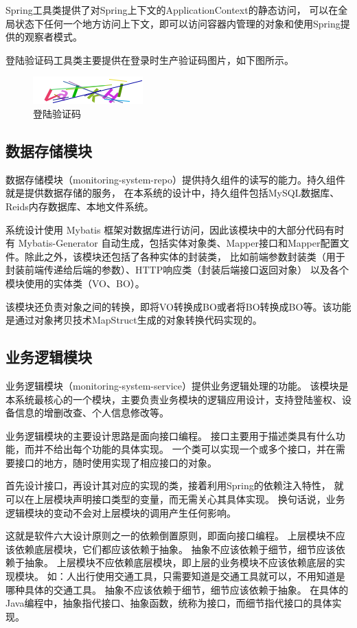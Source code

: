 Spring工具类提供了对Spring上下文的ApplicationContext的静态访问，
可以在全局状态下任何一个地方访问上下文，即可以访问容器内管理的对象和使用Spring提供的观察者模式。

登陆验证码工具类主要提供在登录时生产验证码图片，如下图所示。

\begin{figure}[ht]
    \centering
    \includegraphics[width=0.5\linewidth]{./Figure/IMG_code.png}
    \caption{登陆验证码}\label{Fig:code}
\end{figure}

\subsection{数据存储模块}
数据存储模块（monitoring-system-repo）提供持久组件的读写的能力。持久组件就是提供数据存储的服务，
在本系统的设计中，持久组件包括MySQL数据库、Reids内存数据库、本地文件系统。

系统设计使用 Mybatis 框架对数据库进行访问，因此该模块中的大部分代码有时有 Mybatis-Generator
自动生成，包括实体对象类、Mapper接口和Mapper配置文件。除此之外，该模块还包括了各种实体的封装类，
比如前端参数封装类（用于封装前端传递给后端的参数）、HTTP响应类（封装后端接口返回对象）
以及各个模块使用的实体类（VO、BO）。

该模块还负责对象之间的转换，即将VO转换成BO或者将BO转换成BO等。该功能是通过对象拷贝技术MapStruct生成的对象转换代码实现的。

\subsection{业务逻辑模块}
业务逻辑模块（monitoring-system-service）提供业务逻辑处理的功能。
该模块是本系统最核心的一个模块，主要负责业务模块的逻辑应用设计，支持登陆鉴权、设备信息的增删改查、个人信息修改等。

业务逻辑模块的主要设计思路是面向接口编程。
接口主要用于描述类具有什么功能，而并不给出每个功能的具体实现。
一个类可以实现一个或多个接口，并在需要接口的地方，随时使用实现了相应接口的对象。

首先设计接口，再设计其对应的实现的类，接着利用Spring的依赖注入特性，
就可以在上层模块声明接口类型的变量，而无需关心其具体实现。
换句话说，业务逻辑模块的变动不会对上层模块的调用产生任何影响。

这就是软件六大设计原则之一的依赖倒置原则，即面向接口编程。
上层模块不应该依赖底层模块，它们都应该依赖于抽象。
抽象不应该依赖于细节，细节应该依赖于抽象。
上层模块不应依赖底层模块，即上层的业务模块不应该依赖底层的实现模块。
如：人出行使用交通工具，只需要知道是交通工具就可以，不用知道是哪种具体的交通工具。
抽象不应该依赖于细节，细节应该依赖于抽象。
在具体的Java编程中，抽象指代接口、抽象函数，统称为接口，而细节指代接口的具体实现。

